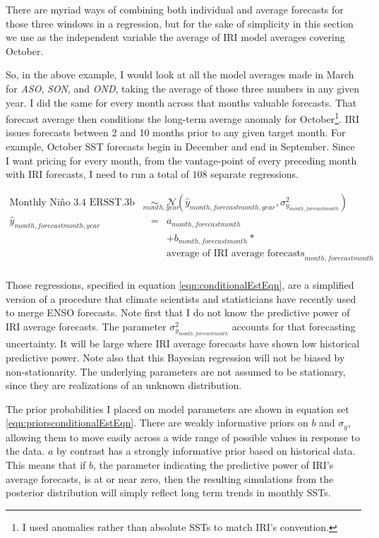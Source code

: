 \documentclass[authoryear]{article}
\begin{document}
There are myriad ways of combining both individual and average forecasts for those three windows in a regression, but for the sake of simplicity in this section we use as the independent variable the average of IRI model averages covering October. 

So, in the above example, I would look at all the model averages made in March for \emph{ASO}, \emph{SON}, and \emph{OND}, taking the average of those three numbers in any given year. I did the same for every month across that months valuable forecasts. That forecast average then conditions the long-term average anomaly for October\footnote{I used anomalies rather than absolute SSTs to match IRI's convention.}. IRI issues forecasts between 2 and 10 months prior to any given target month. For example, October SST forecasts begin in December and end in September. Since I want pricing for every month, from the vantage-point of every preceding month with IRI forecasts, I need to run a total of $108$ separate regressions. 

\begin{equation}
\begin{array}{lcl}
\mbox{Monthly Ni\~no 3.4 ERSST.3b anomalies}_{month,year} & \sim & \mathcal{N}( \hat{y}_{month,forecast month,year}, \sigma_{y_{month,forecast month}}^2 )\\
\hat{y}_{month,forecast month,year} & = & a_{month,forecast month} \\
&& + b_{month,forecast month}*\\
&& \mbox{average of IRI average forecasts}_{month,forecast month}\\
\end{array}
\label{eqn:conditionalEstEqn}
\end{equation}

Those regressions, specified in equation \ref{eqn:conditionalEstEqn}, are a simplified version of a procedure that climate scientists and statisticians have recently used to merge ENSO forecasts\cite{luo2007bayesian}\cite{coelho2004forecast}. Note first that I do not know the predictive power of IRI average forecasts. The parameter $\sigma_{y_{month,forecast month}}^2$ accounts for that forecasting uncertainty. It will be large where IRI average forecasts have shown low historical predictive power. Note also that this Bayesian regression will not be biased by non-stationarity. The underlying parameters are not assumed to be stationary, since they are realizations of an unknown distribution.

The prior probabilities I placed on model parameters are shown in equation set \ref{eqn:priorsconditionalEstEqn}. There are weakly informative priors on $b$ and $\sigma_{y}$, allowing them to move easily across a wide range of possible values in response to the data. $a$ by contrast has a strongly informative prior based on historical data. This means that if $b$, the parameter indicating the predictive power of IRI's average forecasts, is at or near zero, then the resulting simulations from the posterior distribution will simply reflect long term trends in monthly SSTs.
\end{document}
